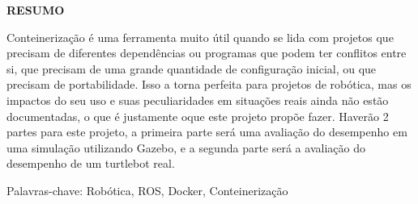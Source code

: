 \centerline{\bfseries RESUMO}
\label{resumo}
\vspace{8mm}

Conteinerização é uma ferramenta muito útil quando se lida com projetos que precisam de diferentes dependências ou programas que podem ter conflitos entre si, que precisam de uma grande quantidade de configuração inicial, ou que precisam de portabilidade. Isso a torna perfeita para projetos de robótica, mas os impactos do seu uso e suas peculiaridades em situações reais ainda não estão documentadas, o que é justamente oque este projeto propõe fazer. Haverão 2 partes para este projeto, a primeira parte será uma avaliação do desempenho em uma simulação utilizando Gazebo, e a segunda parte será a avaliação do desempenho de um turtlebot real.  

Palavras-chave: Robótica, ROS, Docker, Conteinerização

